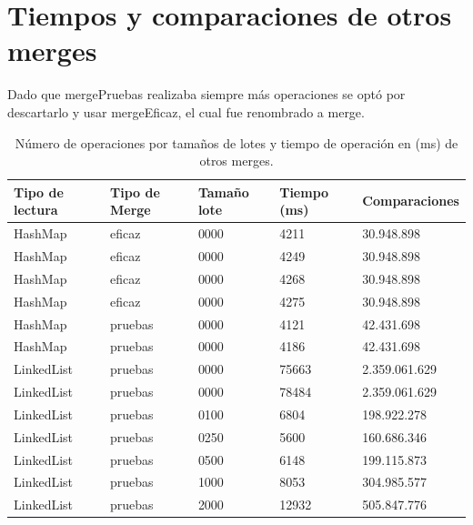 \documentclass[a4paper,11pt]{report}
\begin{document}
\begin{table}[ht]
\section{\label{tablaTiemposComparacionesOtrosMerge}Tiempos y comparaciones de otros merges}
\begin{minipage}{0.95\linewidth}
  Dado que mergePruebas realizaba siempre más operaciones se optó por descartarlo y usar mergeEficaz, el cual fue renombrado a merge.

\centering
\begin{tabular}{>{\ttfamily}l l l l l}
\toprule
\normalfont Tipo de lectura & Tipo de Merge & Tamaño lote & Tiempo (ms) & Comparaciones \\
\midrule
HashMap & eficaz & 0000 & 4211 & 30.948.898\\
HashMap & eficaz & 0000 & 4249 & 30.948.898\\
HashMap & eficaz & 0000 & 4268 & 30.948.898\\
HashMap & eficaz & 0000 & 4275 & 30.948.898\\
\midrule
HashMap & pruebas & 0000 & 4121 & 42.431.698\\
HashMap & pruebas & 0000 & 4186 & 42.431.698\\
\midrule
LinkedList & pruebas & 0000 & 75663 & 2.359.061.629\\
LinkedList & pruebas & 0000 & 78484 & 2.359.061.629\\
LinkedList & pruebas & 0100 & 6804 & 198.922.278\\
LinkedList & pruebas & 0250 & 5600 & 160.686.346\\
LinkedList & pruebas & 0500 & 6148 & 199.115.873\\
LinkedList & pruebas & 1000 & 8053 & 304.985.577\\
LinkedList & pruebas & 2000 & 12932 & 505.847.776\\
\bottomrule
\end{tabular}
\caption{Número de operaciones por tamaños de lotes y tiempo de operación en (ms) de otros merges.}
\end{minipage}\smallskip
\end{table}
\end{document}
